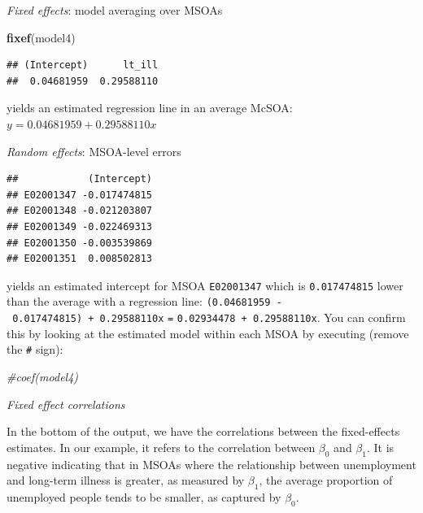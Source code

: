 \documentclass[]{book}
\newenvironment{Shaded}{\begin{snugshade}}{\end{snugshade}}
\newcommand{\KeywordTok}[1]{\textcolor[rgb]{0.13,0.29,0.53}{\textbf{#1}}}
\newcommand{\DecValTok}[1]{\textcolor[rgb]{0.00,0.00,0.81}{#1}}
\newcommand{\StringTok}[1]{\textcolor[rgb]{0.31,0.60,0.02}{#1}}
\newcommand{\CommentTok}[1]{\textcolor[rgb]{0.56,0.35,0.01}{\textit{#1}}}
\newcommand{\OperatorTok}[1]{\textcolor[rgb]{0.81,0.36,0.00}{\textbf{#1}}}
\newcommand{\NormalTok}[1]{#1}
\begin{document}
\emph{Fixed effects}: model averaging over MSOAs

\begin{Shaded}
\begin{Highlighting}[]
\KeywordTok{fixef}\NormalTok{(model4)}
\end{Highlighting}
\end{Shaded}

\begin{verbatim}
## (Intercept)      lt_ill 
##  0.04681959  0.29588110
\end{verbatim}

yields an estimated regression line in an average McSOA:
\(y = 0.04681959 + 0.29588110x\)

\emph{Random effects}: MSOA-level errors

\begin{Shaded}
\end{Shaded}

\begin{verbatim}
##            (Intercept)
## E02001347 -0.017474815
## E02001348 -0.021203807
## E02001349 -0.022469313
## E02001350 -0.003539869
## E02001351  0.008502813
\end{verbatim}

yields an estimated intercept for MSOA \texttt{E02001347} which is
\texttt{0.017474815} lower than the average with a regression line:
\texttt{(0.04681959\ -\ 0.017474815)\ +\ 0.29588110x} \texttt{=}
\texttt{0.02934478\ +\ 0.29588110x}. You can confirm this by looking at
the estimated model within each MSOA by executing (remove the
\texttt{\#} sign):

\begin{Shaded}
\begin{Highlighting}[]
\CommentTok{#coef(model4)}
\end{Highlighting}
\end{Shaded}

\emph{Fixed effect correlations}

In the bottom of the output, we have the correlations between the
fixed-effects estimates. In our example, it refers to the correlation
between \(\beta_{0}\) and \(\beta_{1}\). It is negative indicating that
in MSOAs where the relationship between unemployment and long-term
illness is greater, as measured by \(\beta_{1}\), the average proportion
of unemployed people tends to be smaller, as captured by \(\beta_{0}\).
\end{document}
